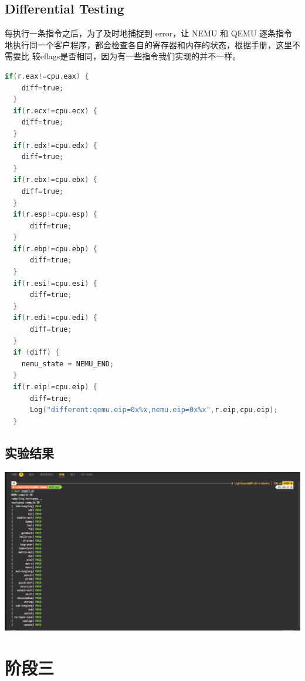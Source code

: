 \documentclass[UTF8,a4paper,10pt]{ctexart}
\begin{document}
\subsection{Differential Testing}
每执行一条指令之后，为了及时地捕捉到 error，让 NEMU 和 QEMU 逐条指令地执行同一个客户程序，都会检查各自的寄存器和内存的状态，根据手册，这里不需要比 较eflags是否相同，因为有一些指令我们实现的并不一样。

\begin{lstlisting}[language = C]
  if(r.eax!=cpu.eax) {
    diff=true;
  }
  if(r.ecx!=cpu.ecx) {
    diff=true;
  }
  if(r.edx!=cpu.edx) {
    diff=true;
  }
  if(r.ebx!=cpu.ebx) {
    diff=true;
  }
  if(r.esp!=cpu.esp) {
	  diff=true;
  }
  if(r.ebp!=cpu.ebp) {
	  diff=true;
  }
  if(r.esi!=cpu.esi) {
	  diff=true;
  }
  if(r.edi!=cpu.edi) {
	  diff=true;
  }
  if (diff) {
    nemu_state = NEMU_END;
  }
  if(r.eip!=cpu.eip) {
	  diff=true;
	  Log("different:qemu.eip=0x%x,nemu.eip=0x%x",r.eip,cpu.eip);
  }
\end{lstlisting}
\subsection{实验结果}
\begin{center}
  \includegraphics*[scale = 0.25]{runall}
\end{center}
\section{阶段三}
\end{document}
